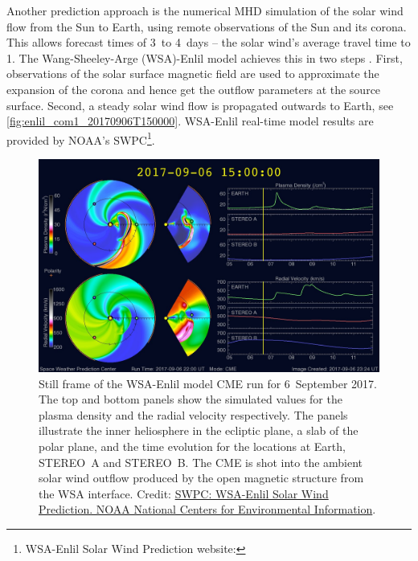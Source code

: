 Another prediction approach is the numerical MHD simulation of the solar wind flow from the Sun to Earth, using remote observations of the Sun and its corona. This allows forecast times of 3~to 4~days -- the solar wind's average travel time to \SI{1}{\au}. The Wang-Sheeley-Arge (WSA)-Enlil model achieves this in two steps \citep{Pizzo2011}. First, observations of the solar surface magnetic field are used to approximate the expansion of the corona and hence get the outflow parameters at the source surface. Second, a steady solar wind flow is propagated outwards to Earth, see \autoref{fig:enlil_com1_20170906T150000}. WSA-Enlil real-time model results are provided by NOAA's SWPC\footnote{WSA-Enlil Solar Wind Prediction website: }.
\begin{figure}[t]
	\centering
	\includegraphics[width=\textwidth]{figures_of_others/images/enlil_com1_20170906T150000.jpg}
	\caption[Credit: \href{http://dx.doi.org/10.7289/V5445JGH}{SWPC: WSA-Enlil Solar Wind Prediction. NOAA National Centers for Environmental Information}.]
	{Still frame of the WSA-Enlil model CME run for 6~September 2017. The top and bottom panels show the simulated values for the plasma density and the radial velocity respectively. The panels illustrate the inner heliosphere in the ecliptic plane, a slab of the polar plane, and the time evolution for the locations at Earth, STEREO~A and STEREO~B. The CME is shot into the ambient solar wind outflow produced by the open magnetic structure from the WSA interface. Credit: \href{http://dx.doi.org/10.7289/V5445JGH}{SWPC: WSA-Enlil Solar Wind Prediction. NOAA National Centers for Environmental Information}.}
	\label{fig:enlil_com1_20170906T150000}
\end{figure}

